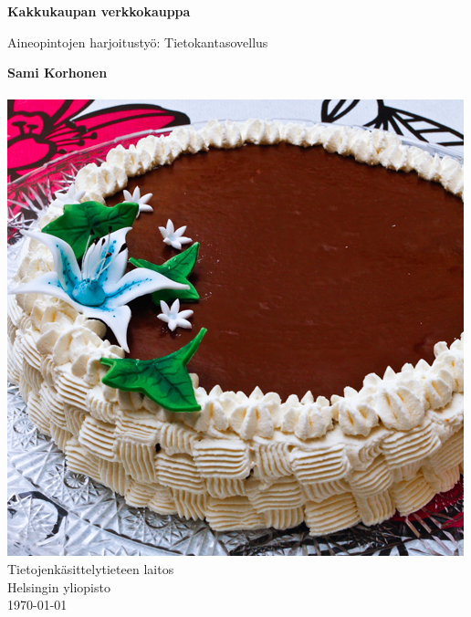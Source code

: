 \documentclass[a4paper,12pt, titlepage]{article}
\begin{document}
\begin{titlepage}
    \begin{center}
        \vspace*{1cm}
        
        \LARGE
        \textbf{Kakkukaupan verkkokauppa}
        
        \vspace{0.5cm}
        \Large
        Aineopintojen harjoitustyö: Tietokantasovellus
        
        \vspace{1.5cm}
        
        \large
        \textbf{Sami Korhonen} \\
         \\
        \vfill
        \includegraphics[scale=0.3]{../imgs/kinuskikakku.jpg}\\

		\vfill        
        \normalsize
        Tietojenkäsittelytieteen laitos\\
        Helsingin yliopisto\\
		\large        
        \today
        
    \end{center}
\end{titlepage}
\end{document}
